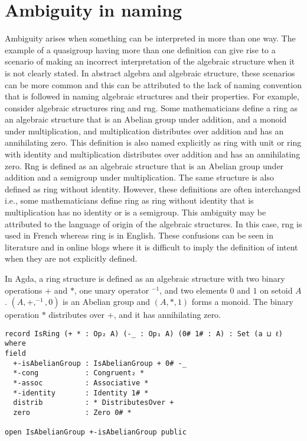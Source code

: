 \section{Ambiguity in naming}
Ambiguity arises when something can be interpreted in more than one way. The
example of a quasigroup having more than one definition can give rise to a
scenario of making an incorrect interpretation of the algebraic structure when
it is not clearly stated. In abstract algebra and algebraic structure, these
scenarios can be more common and this can be attributed to the lack of naming
convention that is followed in naming algebraic structures and their properties.
For example, consider algebraic structures ring and rng. Some mathematicians
define a ring as an algebraic structure that is an Abelian group under addition,
and a monoid under multiplication, and multiplication distributes over addition
and has an annihilating zero. This definition is also named explicitly as ring
with unit or ring with identity and multiplication distributes over addition and
has an annihilating zero. Rng is defined as an algebraic structure that is an
Abelian group under addition and a semigroup under multiplication. The same
structure is also defined as ring without identity. However, these definitions
are often interchanged i.e., some mathematicians define ring as ring without
identity that is multiplication has no identity or is a semigroup. This
ambiguity may be attributed to the language of origin of the algebraic
structures. In this case, rng is used in French whereas ring is in English.
These confusions can be seen in literature and in online blogs where it is
difficult to imply the definition of intent when they are not explicitly
defined. 

In Agda, a ring structure is defined as an algebraic structure with two binary
operations $+$ and $*$, one unary operator $^{-1}$, and two elements $0$ and $1$
on setoid $A$. $(A,+,^{-1},0)$ is an Abelian group and $(A,*,1)$ forms a monoid.
The binary operation $*$ distributes over $+$, and it has annihilating zero.

\begin{verbatim}
record IsRing (+ * : Op₂ A) (-_ : Op₁ A) (0# 1# : A) : Set (a ⊔ ℓ) where
field
  +-isAbelianGroup : IsAbelianGroup + 0# -_
  *-cong           : Congruent₂ *
  *-assoc          : Associative *
  *-identity       : Identity 1# *
  distrib          : * DistributesOver +
  zero             : Zero 0# *

open IsAbelianGroup +-isAbelianGroup public
\end{verbatim} 

